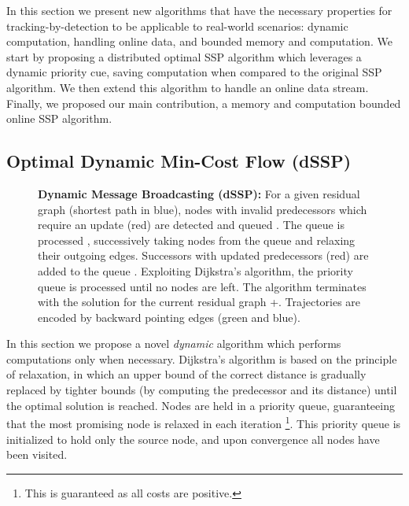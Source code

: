 \documentclass[10pt,twocolumn,letterpaper]{article}
\begin{document}
In this section we present new algorithms that have the necessary properties  for tracking-by-detection to be applicable to  real-world scenarios: dynamic computation, handling online data, and bounded memory and computation. We start by proposing a distributed optimal SSP algorithm which leverages a dynamic priority cue, saving computation when compared to the original SSP algorithm. 
We then extend this algorithm to handle an online data stream. Finally, we proposed our main contribution, a memory and computation bounded online SSP algorithm. 

\subsection{Optimal Dynamic Min-Cost Flow (dSSP)}
\label{subsec:dDijkstra}

\begin{figure*}[ht]
\caption{{\bf Dynamic Message Broadcasting (dSSP):}
For a given residual graph (shortest path in blue), nodes with invalid predecessors which require an update (red) are detected and queued \protect{}.
The queue is processed \protect{}, successively taking nodes from the queue and relaxing their outgoing edges. Successors with updated predecessors (red) are added to the queue \protect{}. Exploiting Dijkstra's algorithm, the priority queue is processed until no nodes are left. The algorithm terminates with the solution for the current residual graph \protect{}+\protect{}. Trajectories are encoded by backward pointing edges (green and blue).
}
\label{fig:dDijkstra}
\vspace{-0.3cm}
\end{figure*}

In this section we propose  a novel {\it dynamic} algorithm which performs computations only when necessary. 
Dijkstra's algorithm is based on the principle of relaxation, in which an upper bound of the correct distance is gradually replaced by tighter bounds (by computing the predecessor and its distance) until the optimal solution is reached. Nodes are held in a priority queue, guaranteeing that the most promising node is relaxed in each iteration \footnote{This is guaranteed as all costs are positive. 
}. This priority queue is initialized to hold only the source node, and upon convergence all nodes have been visited.
\end{document}
